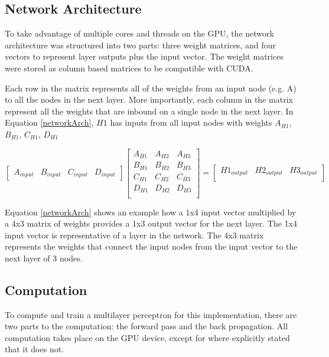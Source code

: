 \documentclass[jair, twoside,11pt,theapa]{article}
\begin{document}
\subsection{Network Architecture}
\label{Network Arch Section}
To take advantage of multiple cores and threads on the GPU, the network architecture was structured into two parts: three weight matrices, and four vectors to represent layer outputs plus the input vector. 
The weight matrices were stored as column based matrices to be compatible with CUDA. 

Each row in the matrix represents all of the weights from an input node (e.g. A) to all the nodes in the next layer. 
More importantly, each column in the matrix represent all the weights that are inbound on a single node in the next layer. 
In Equation \ref{networkArch}, $H1$ has inputs from all input nodes with weights $A_{H1}$, $B_{H1}$, $C_{H1}$, $D_{H1}$

\begin{equation}
\label{networkArch}
\left[
\begin{array}{cccc}
A_{input} & B_{input} & C_{input} & D_{input}
\end{array} 
\right]
%
\left[
\begin{array}{ccc}
A_{H1} & A_{H2} & A_{H3} \\
B_{H1} & B_{H2} & B_{H3} \\
C_{H1} & C_{H2} & C_{H3} \\
D_{H1} & D_{H2} & D_{H3} \\
\end{array} 
\right]
% 
= 
\left[
\begin{array}{ccc}
H1_{output} & H2_{output} & H3_{output} \\
\end{array} 
\right]
\end{equation}

Equation \ref{networkArch} shows an example how a 1x4 input vector multiplied by a 4x3 matrix of weights provides a 1x3 output vector for the next layer. 
The 1x4 input vector is representative of a layer in the network.
The 4x3 matrix represents the weights that connect the input nodes from the input vector to the next layer of 3 nodes. 

\subsection{Computation}
To compute and train a multilayer perceptron for this implementation, there are two parts to the computation: the forward pass and the back propagation. 
All computation takes place on the GPU device, except for where explicitly stated that it does not. 
\end{document}
